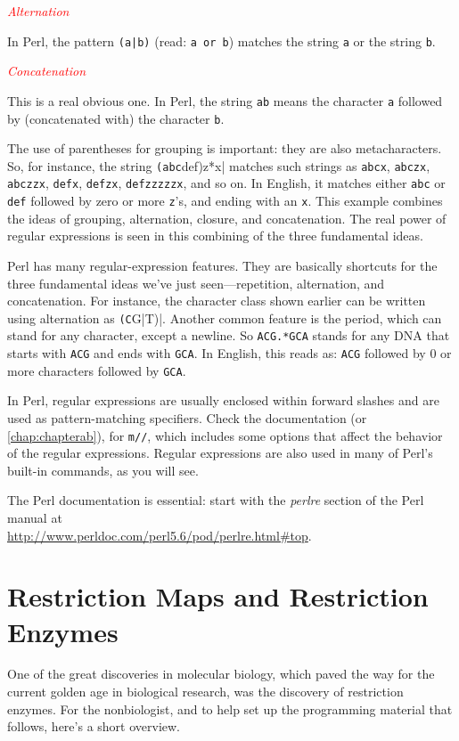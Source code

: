 \textcolor{red}{\textit{Alternation}}
\begin{adjustwidth}{1cm}{}
In Perl, the pattern \verb=(a|b)= (read: \verb|a or b|) matches the string \verb|a| or the string \verb|b|.
\end{adjustwidth}

\textcolor{red}{\textit{Concatenation}}
\begin{adjustwidth}{1cm}{}
This is a real obvious one. In Perl, the string \verb|ab| means the character \verb|a| followed by (concatenated with) the character \verb|b|.
\end{adjustwidth}

The use of parentheses for grouping is important: they are also metacharacters. So, for instance, the string \verb|(abc|def)z*x| matches such strings as \verb|abcx|, \verb|abczx|, \verb|abczzx|, \verb|defx|, \verb|defzx|, \verb|defzzzzzx|, and so on. In English, it matches either \verb|abc| or \verb|def| followed by zero or more \verb|z|'s, and ending with an \verb|x|. This example combines the ideas of grouping, alternation, closure, and concatenation. The real power of regular expressions is seen in this combining of the three fundamental ideas. 

Perl has many regular-expression features. They are basically shortcuts for the three fundamental ideas we've just seen—repetition, alternation, and concatenation. For instance, the character class shown earlier can be written using alternation as \verb|(C|G|T)|. Another common feature is the period, which can stand for any character, except a newline. So \verb|ACG.*GCA| stands for any DNA that starts with \verb|ACG| and ends with \verb|GCA|. In English, this reads as: \verb|ACG| followed by 0 or more characters followed by \verb|GCA|. 

In Perl, regular expressions are usually enclosed within forward slashes and are used as pattern-matching specifiers. Check the documentation (or \autoref{chap:chapterab}), for \verb|m//|, which includes some options that affect the behavior of the regular expressions. Regular expressions are also used in many of Perl's built-in commands, as you will see.

The Perl documentation is essential: start with the \textit{perlre} section of the Perl manual at\\
\href{http://www.perldoc.com/perl5.6/pod/perlre.html\#top}{http://www.perldoc.com/perl5.6/pod/perlre.html\#top}. 

\section{Restriction Maps and Restriction Enzymes}
One of the great discoveries in molecular biology, which paved the way for the current golden age in biological research, was the discovery of restriction enzymes. For the nonbiologist, and to help set up the programming material that follows, here's a short overview. 

